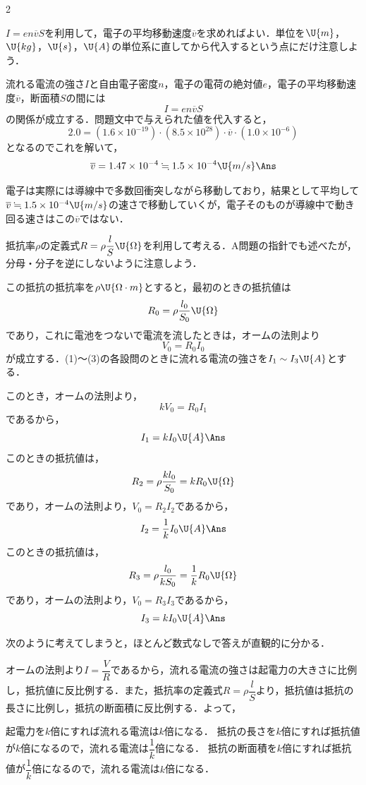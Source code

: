 \begin{multicols}{2}
\par\nopagebreak
\begin{sisin}
$I=en\overline{v}S$を利用して，電子の平均移動速度$\overline{v}$を求めればよい．単位を$\U{m}$，$\U{kg}$，$\U{s}$，$\U{A}$の単位系に直してから代入するという点にだけ注意しよう．
\end{sisin}
\KaiHead
流れる電流の強さ$I$と自由電子密度$n$，電子の電荷の絶対値$e$，電子の平均移動速度$\overline{v}$，断面積$S$の間には
\[I=en\overline{v}S\]
の関係が成立する．問題文中で与えられた値を代入すると，
\[2.0=(1.6\times 10^{-19})\cdot(8.5\times 10^{28})\cdot\overline{v}\cdot(1.0\times 10^{-6})\]
となるのでこれを解いて，
\[\overline{v}=1.47\times 10^{-4}\fallingdotseq 1.5\times 10^{-4}\U{m/s}\Ans\]
\begin{chuu}
電子は実際には導線中で多数回衝突しながら移動しており，結果として平均して$\overline{v}\fallingdotseq 1.5\times 10^{-4}\U{m/s}$の速さで移動していくが，電子そのものが導線中で動き回る速さはこの$\overline{v}$ではない．
\end{chuu}

\par\nopagebreak
\begin{sisin}
抵抗率$\rho$の定義式$R=\rho\dfrac{l}{S}\U{\Omega}$を利用して考える．A問題の指針でも述べたが，分母・分子を逆にしないように注意しよう．
\end{sisin}
\KaiHead
この抵抗の抵抗率を$\rho\U{\Omega\cdot m}$とすると，最初のときの抵抗値は
\[R_0=\rho\frac{l_0}{S_0}\U{\Omega}\]
であり，これに電池をつないで電流を流したときは，オームの法則より
\[V_0=R_0I_0\]
が成立する．(1)〜(3)の各設問のときに流れる電流の強さを$I_1\sim I_3\U{A}$とする．
\begin{komon}
 このとき，オームの法則より，
       \[kV_0=R_0I_1\]
       であるから，
       \[I_1=kI_0\U{A}\Ans\]
 このときの抵抗値は，
       \[R_2=\rho\frac{kl_0}{S_0}=kR_0\U{\Omega}\]
       であり，オームの法則より，$V_0=R_2I_2$であるから，
       \[I_2=\frac{1}{k}I_0\U{A}\Ans\]
 このときの抵抗値は，
       \[R_3=\rho\frac{l_0}{kS_0}=\frac{1}{k}R_0\U{\Omega}\]
       であり，オームの法則より，$V_0=R_3I_3$であるから，
       \[I_3=kI_0\U{A}\Ans\]
\end{komon}
\begin{bekkai}
次のように考えてしまうと，ほとんど数式なしで答えが直観的に分かる．

オームの法則より$I=\dfrac{V}{R}$であるから，流れる電流の強さは起電力の大きさに比例し，抵抗値に反比例する．また，抵抗率の定義式$R=\rho\dfrac{l}{S}$より，抵抗値は抵抗の長さに比例し，抵抗の断面積に反比例する．よって，
\begin{komon}
 起電力を$k$倍にすれば流れる電流は$k$倍になる．
 抵抗の長さを$k$倍にすれば抵抗値が$k$倍になるので，流れる電流は$\dfrac{1}{k}$倍になる．
 抵抗の断面積を$k$倍にすれば抵抗値が$\dfrac{1}{k}$倍になるので，流れる電流は$k$倍になる．
\end{komon}
\end{bekkai}


\end{multicols}
